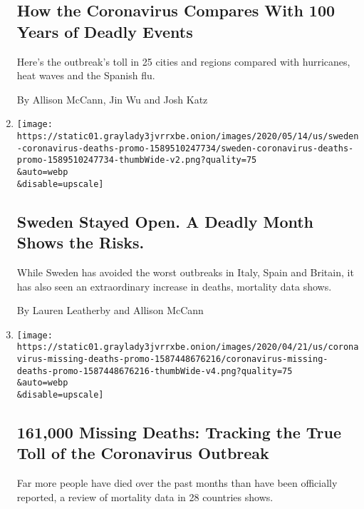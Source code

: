 \begin{enumerate}
  \hypertarget{how-the-coronavirus-compares-with-100-years-of-deadly-events}{%
  \subsection{How the Coronavirus Compares With 100 Years of Deadly
  Events}\label{how-the-coronavirus-compares-with-100-years-of-deadly-events}}

  Here's the outbreak's toll in 25 cities and regions compared with
  hurricanes, heat waves and the Spanish flu.

  By Allison McCann, Jin Wu and Josh Katz
\item
  \href{/interactive/2020/05/15/world/europe/sweden-coronavirus-deaths.html}{}

  \texttt{[image: https://static01.graylady3jvrrxbe.onion/images/2020/05/14/us/sweden-coronavirus-deaths-promo-1589510247734/sweden-coronavirus-deaths-promo-1589510247734-thumbWide-v2.png?quality=75\\\&auto=webp\\\&disable=upscale]}

  \hypertarget{sweden-stayed-open-a-deadly-month-shows-the-risks}{%
  \subsection{Sweden Stayed Open. A Deadly Month Shows the
  Risks.}\label{sweden-stayed-open-a-deadly-month-shows-the-risks}}

  While Sweden has avoided the worst outbreaks in Italy, Spain and
  Britain, it has also seen an extraordinary increase in deaths,
  mortality data shows.

  By Lauren Leatherby and Allison McCann
\item
  \href{/interactive/2020/04/21/world/coronavirus-missing-deaths.html}{}

  \texttt{[image: https://static01.graylady3jvrrxbe.onion/images/2020/04/21/us/coronavirus-missing-deaths-promo-1587448676216/coronavirus-missing-deaths-promo-1587448676216-thumbWide-v4.png?quality=75\\\&auto=webp\\\&disable=upscale]}

  \hypertarget{161000-missing-deaths-tracking-the-true-toll-of-the-coronavirus-outbreak}{%
  \subsection{161,000 Missing Deaths: Tracking the True Toll of the
  Coronavirus
  Outbreak}\label{161000-missing-deaths-tracking-the-true-toll-of-the-coronavirus-outbreak}}

  Far more people have died over the past months than have been
  officially reported, a review of mortality data in 28 countries shows.


\end{enumerate}
